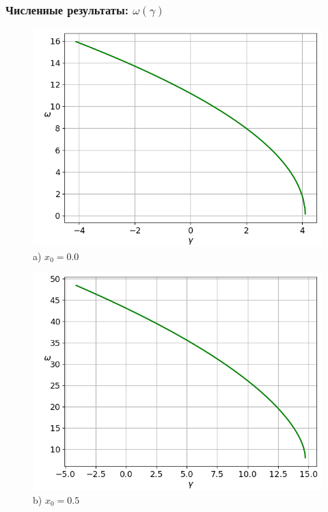 \documentclass[fullscreen=true, unicode, bookmarks=false]{beamer}
\begin{document}
\begin{frame}
\frametitle{ Численные результаты: $ \omega(\gamma) $ }

\begin{figure} 
\begin{minipage}[h]{0.49\linewidth}
\begin{center}
\includegraphics[scale=0.33]{omegas_x0=0,0.png} \\ {\scriptsize a) $ x_0 = 0.0 $}
\end{center}
\end{minipage} 
\hfill
\begin{minipage}[h]{0.49\linewidth}
\begin{center}
\includegraphics[scale=0.33]{omegas_x0=0,5.png}  \\ {\scriptsize b) $ x_0 = 0.5 $}
\end{center}
\end{minipage} 
\end{figure}

\end{frame}
\end{document}
